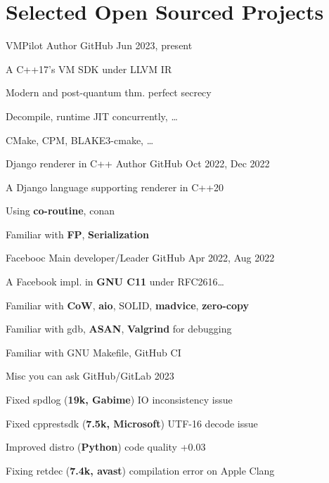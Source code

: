 \section*{Selected Open Sourced Projects}
\vspace*{-25pt}
\begin{multicols}{2}
\def\customTextWidth{0.5\textwidth}
\cventry
{VMPilot}
{Author}
{GitHub}
{Jun 2023, present}
{
    \begin{cvitem}
        \item {A C++17's VM SDK under LLVM IR}
        \item {Modern and post-quantum thm. perfect secrecy}
        \item {Decompile, runtime JIT concurrently, \dots}
        \item {CMake, CPM, BLAKE3-cmake, \dots}
    \end{cvitem}
}

\cventry
{Django renderer in C++}
{Author}
{GitHub} %
{Oct 2022, Dec 2022} %
{
    \begin{cvitem} %
    \item {A Django language supporting renderer in C++20}
    \item {Using \textbf{co-routine}, conan}
    \item {Familiar with \textbf{FP}, \textbf{Serialization}}
    \end{cvitem}
}

\cventry
{Facebooc}
{Main developer/Leader}
{GitHub} %
{Apr 2022, Aug 2022} %
{
    \begin{cvitem} %
        \item {A Facebook impl. in \textbf{GNU C11} under RFC2616\dots}
        \item {Familiar with \textbf{CoW}, \textbf{aio}, SOLID, \textbf{madvice}, \textbf{zero-copy}}
        \item {Familiar with gdb, \textbf{ASAN}, \textbf{Valgrind} for debugging}
        \item {Familiar with GNU Makefile, GitHub CI}
    \end{cvitem}
}

\cventry
{Misc you can ask}
{}
{GitHub/GitLab}
{2023}
{
    \begin{cvitem}
        \item {Fixed spdlog (\textbf{19k, Gabime}) IO inconsistency issue}
        \item {Fixed cpprestsdk (\textbf{7.5k, Microsoft}) UTF-16 decode issue}
        \item {Improved distro (\textbf{Python}) code quality +0.03}
        \item {Fixing retdec (\textbf{7.4k, avast}) compilation error on Apple Clang}
    \end{cvitem}
}

\def\customTextWidth{\textwidth}
\end{multicols}
